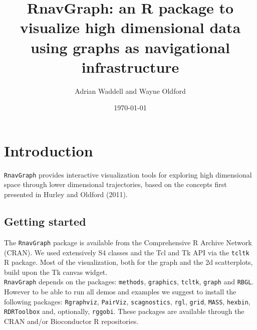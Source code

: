 \documentclass[12pt,oneside,titlepage,letter]{article}
\title{RnavGraph: an R package to visualize high dimensional data using graphs as navigational infrastructure}
\author{Adrian Waddell and Wayne Oldford}
\date{\today}
\begin{document}
\maketitle

\tableofcontents

\newpage
\section{Introduction}
\texttt{RnavGraph} provides interactive visualization tools for exploring high dimensional space through lower dimensional trajectories, based on the concepts first presented in Hurley and Oldford (2011).  

\subsection{Getting started}
The \texttt{RnavGraph}  package is available from the Comprehensive R Archive Network (CRAN). We used extensively S4 classes and the Tcl and Tk API via the \texttt{tcltk} R package. Most of the visualization, both for the graph and the 2d scatterplots, build upon the Tk canvas widget.\\

\texttt{RnavGraph} depends on the packages: \texttt{methods}, \texttt{graphics}, \texttt{tcltk}, \texttt{graph} and \texttt{RBGL}. However to be able to run all demos and examples we suggest to install the following packages: \texttt{Rgraphviz}, \texttt{PairViz}, \texttt{scagnostics}, \texttt{rgl}, \texttt{grid}, \texttt{MASS}, \texttt{hexbin}, \texttt{RDRToolbox} and, optionally, \texttt{rggobi}.   These packages are available through the CRAN and/or Bioconductor R repositories. \\
\end{document}
